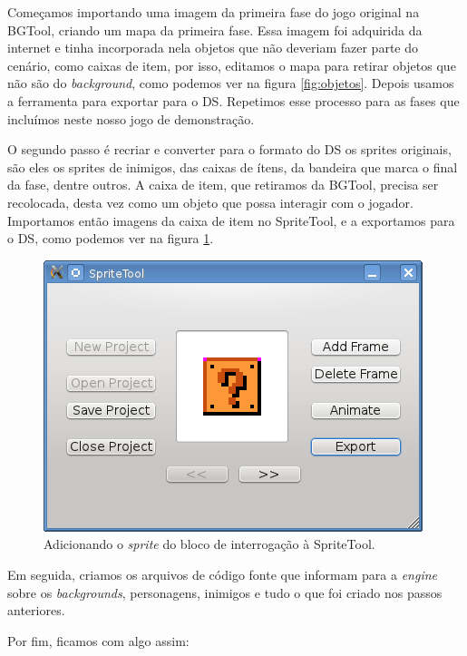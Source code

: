 \documentclass[brazil]{abnt}
\begin{document}
Começamos importando uma imagem da primeira fase do jogo original na BGTool, criando um mapa da primeira fase. Essa imagem foi adquirida da internet e tinha incorporada nela objetos que não deveriam fazer parte do cenário, como caixas de item, por isso, editamos o mapa para retirar objetos que não são do \textit{background}, como podemos ver na figura \ref{fig:objetos}. Depois usamos a ferramenta para exportar para o DS. Repetimos esse processo para as fases que incluímos neste nosso jogo de demonstração.

O segundo passo é recriar e converter para o formato do DS os sprites originais, são eles os sprites de inimigos, das caixas de ítens, da bandeira que marca o final da fase, dentre outros. A caixa de item, que retiramos da BGTool, precisa ser recolocada, desta vez como um objeto que possa interagir com o jogador. Importamos então imagens da caixa de item no SpriteTool, e a exportamos para o DS, como podemos ver na figura \ref{fig:itembox}.

\begin{figure}[h!]
\centering
\includegraphics{imgs/spritetool3.png}
\caption{Adicionando o \textit{sprite} do bloco de interrogação à SpriteTool.}
\label{fig:itembox}
\end{figure}

Em seguida, criamos os arquivos de código fonte que informam para a \textit{engine} sobre os \textit{backgrounds}, personagens, inimigos e tudo o que foi criado nos passos anteriores.



Por fim, ficamos com algo assim:
\end{document}
